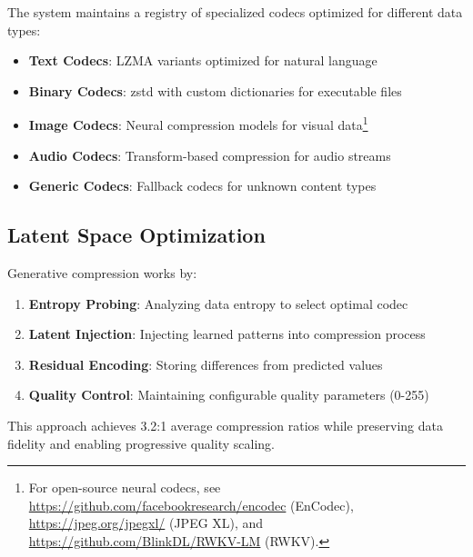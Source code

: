 \documentclass[11pt,a4paper]{article}
\begin{document}
	The system maintains a registry of specialized codecs optimized for different data types:
	\begin{itemize}
		\item \textbf{Text Codecs}: LZMA variants optimized for natural language
		\item \textbf{Binary Codecs}: zstd with custom dictionaries for executable files
		\item \textbf{Image Codecs}: Neural compression models for visual data\footnote{For open-source neural codecs, see \url{https://github.com/facebookresearch/encodec} (EnCodec), \url{https://jpeg.org/jpegxl/} (JPEG XL), and \url{https://github.com/BlinkDL/RWKV-LM} (RWKV).}
		\item \textbf{Audio Codecs}: Transform-based compression for audio streams
		\item \textbf{Generic Codecs}: Fallback codecs for unknown content types
	\end{itemize}
	
	\subsection{Latent Space Optimization}
	
	Generative compression works by:
	\begin{enumerate}
		\item \textbf{Entropy Probing}: Analyzing data entropy to select optimal codec
		\item \textbf{Latent Injection}: Injecting learned patterns into compression process
		\item \textbf{Residual Encoding}: Storing differences from predicted values
		\item \textbf{Quality Control}: Maintaining configurable quality parameters (0-255)
	\end{enumerate}
	
	This approach achieves 3.2:1 average compression ratios while preserving data fidelity and enabling progressive quality scaling.
	
\end{document}

